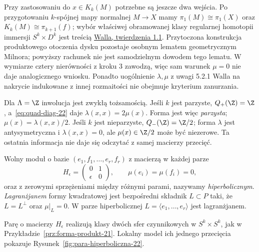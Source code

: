 Przy zastosowaniu do $x\in K_k(M)$ potrzebne są
jeszcze dwa wejścia. Po przygotowaniu
$k$-spójnej mapy normalnej $M\to X$ mamy
$\pi_1(M)\cong\pi_1(X)$ oraz
$K_k(M)\cong\pi_{k+1}(f)$; wybór właściwej
obramowanej klasy regularnej homotopii immersji
$S^k\times D^k$ jest treścią
\href{https://webhomes.maths.ed.ac.uk/~v1ranick/books/scm.pdf}
{Walla, twierdzenia 1.1}. Przytoczona konstrukcja
produktowego otoczenia dysku pozostaje osobnym
lematem geometrycznym Milnora; powyższy rachunek
nie jest samodzielnym dowodem tego lematu.
W wymiarze cztery nierówności z kroku 3 zawodzą,
więc sam warunek $\mu=0$ nie daje analogicznego
wniosku. Ponadto uogólnienie $\lambda,\mu$ z
uwagi 5.2.1 Walla na nakrycie indukowane z innej
rozmaitości nie obejmuje kryterium zanurzania.

\begin{przyklad}[Co zostaje, gdy $\pi=1$]
\label{prz:mu-Z-22}
Dla $\Lambda=\Z$ inwolucja jest zwykłą tożsamością.
Jeśli $k$ jest parzyste, $Q_+(\Z)=\Z$,
a~\eqref{eq:quad-diag-22} daje
$\lambda(x,x)=2\mu(x)$. Forma jest więc
\emph{parzysta}; $\mu(x)=\lambda(x,x)/2$.
Jeśli $k$ jest nieparzyste,
$Q_-(\Z)=\Z/2$; forma $\lambda$ jest
antysymetryczna i $\lambda(x,x)=0$,
ale $\mu(x)\in\Z/2$ może być niezerowe.
Ta ostatnia informacja nie daje się odczytać
z samej macierzy przecięć.
\end{przyklad}

\begin{definicja}
\label{def:hiperboliczna-22}
Wolny moduł o bazie $(e_1,f_1,\dots,e_r,f_r)$
z macierzą w każdej parze
\[
 H_\epsilon=
 \begin{pmatrix}0&1\\\epsilon&0\end{pmatrix},
 \qquad \mu(e_i)=\mu(f_i)=0,
\]
oraz z zerowymi sprzężeniami między różnymi
parami, nazywamy \emph{hiperbolicznym}.
\emph{Lagranżjanem} formy kwadratowej jest
bezpośredni składnik $L\subset P$ taki, że
$L=L^\perp$ oraz $\mu|_L=0$.
W parze hiperbolicznej
$L=\langle e_1,\dots,e_r\rangle$ jest lagranżjanem.
\end{definicja}

Parę o macierzy $H_\epsilon$ realizują klasy
dwóch sfer czynnikowych w $S^k\times S^k$,
jak w Przykładzie~\ref{prz:forma-produkt-21}.
Lokalny model ich jednego przecięcia
pokazuje Rysunek~\ref{fig:para-hiperboliczna-22}.

